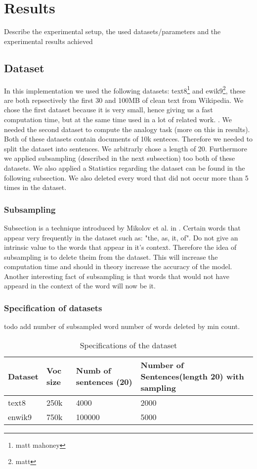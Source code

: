 \chapter{Results}\label{chap:results}


Describe the experimental setup, the used datasets/parameters and the experimental results achieved

\section{Dataset}
In this implementation we used the following datasets: text8\footnote{matt mahoney} and ewik9\footnote{matt}, these are both repsectively the first 30 and 100MB of clean text from Wikipedia. We chose the first dataset because it is very small, hence giving us a fast computation time, but at the same time used in a lot of related work. \cite{intel} \cite{gpu}. We needed the second dataset to compute the analogy task (more on this in results). 
Both of these datasets contain documents of 10k senteces. Therefore we needed to split the dataset into sentences. We arbitrarly chose a length of 20. Furthermore we applied subsampling (described in the next subsection)  too both of these datasets. We also applied a Statistics regarding the dataset can be found in the following subsection. We also deleted every word that did not occur more than 5 times in the dataset. 
\subsection{Subsampling}
Subsection is a technique introduced by Mikolov et al. in \cite{mikolov}. Certain words that appear very frequently in the dataset such as: "the, as, it, of". Do not give an intrinsic value to the words that appear in it's context. Therefore the idea of subsampling is to delete theim from the dataset. This will increase the computation time and should in theory increase the accuracy of the model. Another interesting fact of subsampling is that words that would not have appeard in the context of the word will now be it. 
\subsection{Specification of datasets}
todo add number of subsampled word number of words deleted by min count.
\begin{table}[]
\begin{tabular}{|l|l|l|l|}
\hline
Dataset & Voc size & Numb of sentences (20) & Number of Sentences(length 20) with sampling \\ \hline
text8   & 250k     & 4000                   & 2000                                         \\ \hline
enwik9  & 750k     & 100000                 & 5000                                         \\ \hline
\end{tabular}
\caption{Specifications of the dataset}
\end{table}

